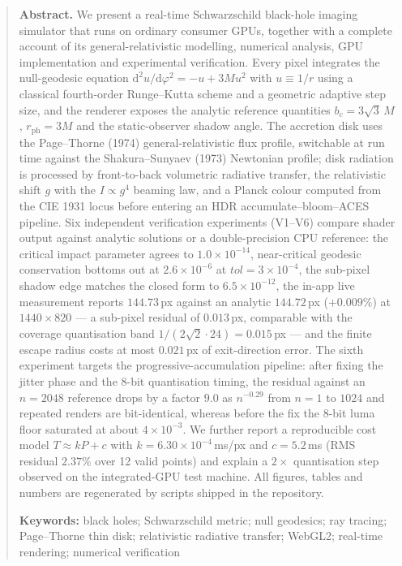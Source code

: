\documentclass[11pt,a4paper,fontset=windows]{ctexart}
\newcommand{\M}{M}
\newcommand{\dd}{\mathrm{d}}
\newcommand{\bph}{r_{\mathrm{ph}}}
\newcommand{\bc}{b_{c}}
\newcommand{\gfac}{g}
\theoremstyle{plain}
\theoremstyle{definition}
\begin{document}
\begin{abstract}
\noindent\textbf{Abstract.}\quad
We present a real-time Schwarzschild black-hole imaging simulator that runs on ordinary
consumer GPUs, together with a complete account of its general-relativistic modelling,
numerical analysis, GPU implementation and experimental verification. Every pixel
integrates the null-geodesic equation $\dd^{2}u/\dd\varphi^{2}=-u+3\M u^{2}$ with $u\equiv1/r$
using a classical fourth-order Runge--Kutta scheme and a geometric adaptive step size, and
the renderer exposes the analytic reference quantities $\bc=3\sqrt3\,\M$, $\bph=3\M$ and the
static-observer shadow angle. The accretion disk uses the Page--Thorne (1974)
general-relativistic flux profile, switchable at run time against the Shakura--Sunyaev (1973)
Newtonian profile; disk radiation is processed by front-to-back volumetric radiative
transfer, the relativistic shift $\gfac$ with the $I\propto\gfac^{4}$ beaming law, and a
Planck colour computed from the CIE 1931 locus before entering an HDR accumulate--bloom--ACES
pipeline. Six independent verification experiments (V1--V6) compare shader output against
analytic solutions or a double-precision CPU reference: the critical impact parameter agrees
to $1.0\times10^{-14}$, near-critical geodesic conservation bottoms out at $2.6\times10^{-6}$
at $tol=3\times10^{-4}$, the sub-pixel shadow edge matches the closed form to $6.5\times10^{-12}$,
the in-app live measurement reports $144.73$\,px against an analytic $144.72$\,px ($+0.009\%$)
at $1440\times820$ --- a sub-pixel residual of $0.013$\,px, comparable with the coverage
quantisation band $1/(2\sqrt2\cdot24)=0.015$\,px ---
and the finite escape radius costs at most $0.021$\,px of exit-direction
error. The sixth experiment targets the progressive-accumulation pipeline: after fixing the
jitter phase and the 8-bit quantisation timing, the residual against an $n=2048$ reference
drops by a factor $9.0$ as $n^{-0.29}$ from $n=1$ to $1024$ and repeated renders are
bit-identical, whereas before the fix the 8-bit luma floor saturated at about
$4\times10^{-3}$. We further report a reproducible cost model $T\approx kP+c$ with
$k=6.30\times10^{-4}$\,ms/px and $c=5.2$\,ms (RMS residual $2.37\%$ over 12 valid points) and
explain a $2\times$ quantisation step observed on the integrated-GPU test machine. All figures,
tables and numbers are regenerated by scripts shipped in the repository.

\noindent\textbf{Keywords:} black holes; Schwarzschild metric; null geodesics; ray tracing;
Page--Thorne thin disk; relativistic radiative transfer; WebGL2; real-time rendering;
numerical verification

\end{abstract}

\newpage
\tableofcontents
\newpage










\appendix

\end{document}
